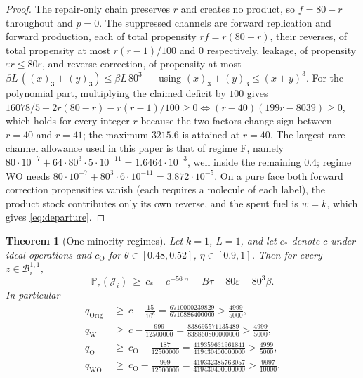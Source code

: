 \documentclass[11pt,a4paper]{article}
\theoremstyle{plain}
\newtheorem{theorem}{Theorem}[section]
\theoremstyle{definition}
\theoremstyle{remark}
\newcommand{\Prob}{\mathbb P}
\newcommand{\B}{\mathcal B}
\newcommand{\eps}{\varepsilon}
\newcommand{\ff}[2]{(#1)_{#2}}
\begin{document}
\begin{proof}
The repair-only chain preserves $r$ and creates no product, so $f=80-r$ throughout and
$p=0$. The suppressed channels are forward replication and forward production, each of
total propensity $rf=r(80-r)$, their reverses, of total propensity at most
$r(r-1)/100$ and $0$ respectively, leakage, of propensity $\eps r\le80\eps$, and reverse
correction, of propensity at most $\beta L\,(\ff x3+\ff y3)\le\beta L\,80^3$ --- using
$\ff x3+\ff y3\le(x+y)^3$. For the polynomial part, multiplying the claimed deficit by
$100$ gives $16078/5-2r(80-r)-r(r-1)/100\ge0 \iff (r-40)(199r-8039)\ge0$, which holds for
every integer $r$ because the two factors change sign between $r=40$ and $r=41$; the
maximum $3215.6$ is attained at $r=40$. The largest rare-channel allowance used in this
paper is that of regime F, namely $80\cdot10^{-7}+64\cdot80^{3}\cdot5\cdot10^{-11}
=1.6464\cdot10^{-3}$, well inside the remaining $0.4$; regime WO needs
$80\cdot10^{-7}+80^{3}\cdot6\cdot10^{-11}=3.872\cdot10^{-5}$. On a pure face both forward
correction propensities vanish (each requires a molecule of each label), the product
stock contributes only its own reverse, and the spent fuel is $w=k$, which gives
\eqref{eq:departure}.
\end{proof}

\begin{theorem}[One-minority regimes]\label{thm:onemin}
Let $k=1$, $L=1$, and let $c_*$ denote $c$ under ideal operations and $c_{\mathrm O}$ for
$\theta\in[0.48,0.52]$, $\eta\in[0.9,1]$. Then for every $z\in\B_i^{1,1}$,
\begin{equation}
\Prob_z(\mathcal J_i)\ \ge\ c_*-e^{-56\gamma\tau}-B\tau-80\eps-80^{3}\beta .
\label{eq:onebound}
\end{equation}
In particular
\begin{align}
q_{\mathrm{Orig}}&\ \ge\ c-\tfrac{15}{10^{6}}
 =\tfrac{6710000239829}{6710886400000}>\tfrac{4999}{5000},\label{eq:qorig}\\
q_{\mathrm W}&\ \ge\ c-\tfrac{999}{12500000}
 =\tfrac{838695571135489}{838860800000000}>\tfrac{4999}{5000},\label{eq:qW}\\
q_{\mathrm O}&\ \ge\ c_{\mathrm O}-\tfrac{187}{12500000}
 =\tfrac{419359631961841}{419430400000000}>\tfrac{4999}{5000},\label{eq:qO}\\
q_{\mathrm{WO}}&\ \ge\ c_{\mathrm O}-\tfrac{999}{12500000}
 =\tfrac{419332385763057}{419430400000000}>\tfrac{9997}{10000}.\label{eq:qWO}
\end{align}
\end{theorem}
\end{document}
